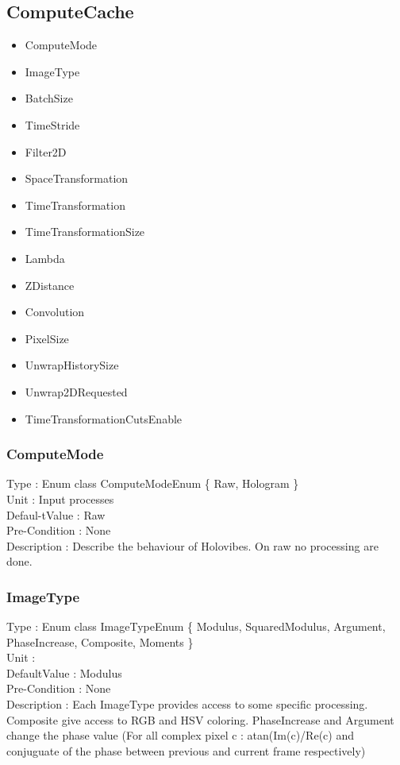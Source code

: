 
\subsection{ComputeCache}
\begin{itemize}
    \item ComputeMode
    \item ImageType
    \item BatchSize
    \item TimeStride
    \item Filter2D
    \item SpaceTransformation
    \item TimeTransformation
    \item TimeTransformationSize
    \item Lambda
    \item ZDistance
    \item Convolution
    \item PixelSize
    \item UnwrapHistorySize
    \item Unwrap2DRequested
    \item TimeTransformationCutsEnable
\end{itemize}

\subsubsection{ComputeMode}
\noindent
Type : Enum class ComputeModeEnum \{ Raw, Hologram \} \\
Unit : Input processes \\
Defaul-tValue : Raw \\
Pre-Condition : None\\
Description : Describe the behaviour of Holovibes. On raw no processing are done.\\

\subsubsection{ImageType}
\noindent
Type : Enum class ImageTypeEnum \{ Modulus, SquaredModulus, Argument, PhaseIncrease, Composite, Moments \}\\
Unit : \\
DefaultValue : Modulus\\
Pre-Condition : None\\
Description : Each ImageType provides access to some specific processing. Composite give access to RGB and HSV coloring. PhaseIncrease and Argument change the phase value (For all complex pixel c : atan(Im(c)/Re(c) and conjuguate of the phase between previous and current frame respectively)\\

